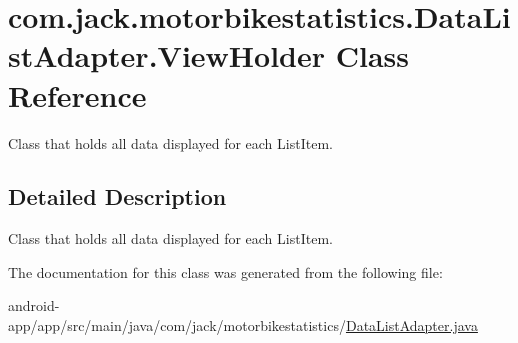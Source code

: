 \hypertarget{classcom_1_1jack_1_1motorbikestatistics_1_1_data_list_adapter_1_1_view_holder}{}\section{com.\+jack.\+motorbikestatistics.\+Data\+List\+Adapter.\+View\+Holder Class Reference}
\label{classcom_1_1jack_1_1motorbikestatistics_1_1_data_list_adapter_1_1_view_holder}


Class that holds all data displayed for each List\+Item.  




\subsection{Detailed Description}
Class that holds all data displayed for each List\+Item. 

The documentation for this class was generated from the following file\+:\begin{DoxyCompactItemize}
\item 
android-\/app/app/src/main/java/com/jack/motorbikestatistics/\hyperlink{_data_list_adapter_8java}{Data\+List\+Adapter.\+java}\end{DoxyCompactItemize}
